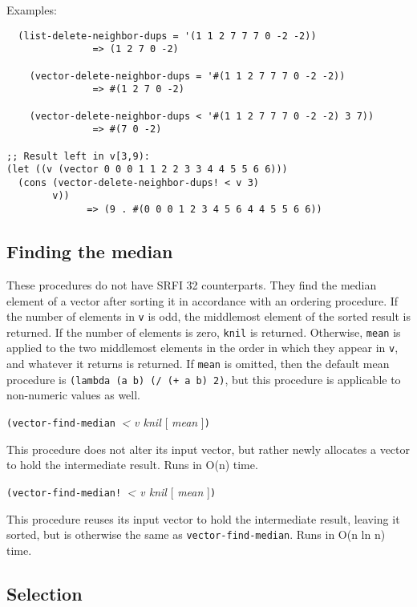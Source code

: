 Examples:

\begin{verbatim}
  (list-delete-neighbor-dups = '(1 1 2 7 7 7 0 -2 -2))
               => (1 2 7 0 -2)

    (vector-delete-neighbor-dups = '#(1 1 2 7 7 7 0 -2 -2))
               => #(1 2 7 0 -2)

    (vector-delete-neighbor-dups < '#(1 1 2 7 7 7 0 -2 -2) 3 7))
               => #(7 0 -2)

;; Result left in v[3,9):
(let ((v (vector 0 0 0 1 1 2 2 3 3 4 4 5 5 6 6)))
  (cons (vector-delete-neighbor-dups! < v 3)
        v))
              => (9 . #(0 0 0 1 2 3 4 5 6 4 4 5 5 6 6))
\end{verbatim}

\subsection{Finding the median}\label{Findingthemedian}

These procedures do not have SRFI 32 counterparts. They find the median
element of a vector after sorting it in accordance with an ordering
procedure. If the number of elements in \texttt{v} is odd, the
middlemost element of the sorted result is returned. If the number of
elements is zero, \texttt{knil} is returned. Otherwise, \texttt{mean} is
applied to the two middlemost elements in the order in which they appear
in \texttt{v}, and whatever it returns is returned. If \texttt{mean} is
omitted, then the default mean procedure is
\texttt{(lambda\ (a\ b)\ (/\ (+\ a\ b)\ 2)}, but this procedure is
applicable to non-numeric values as well.

\texttt{(vector-find-median\ }\emph{\textless{} v knil} {[} \emph{mean}
{]}\texttt{)}

This procedure does not alter its input vector, but rather newly
allocates a vector to hold the intermediate result. Runs in O(n) time.

\texttt{(vector-find-median!\ }\emph{\textless{} v knil} {[} \emph{mean}
{]}\texttt{)}

This procedure reuses its input vector to hold the intermediate result,
leaving it sorted, but is otherwise the same as
\texttt{vector-find-median}. Runs in O(n ln n) time.

\subsection{Selection}\label{Selection}

